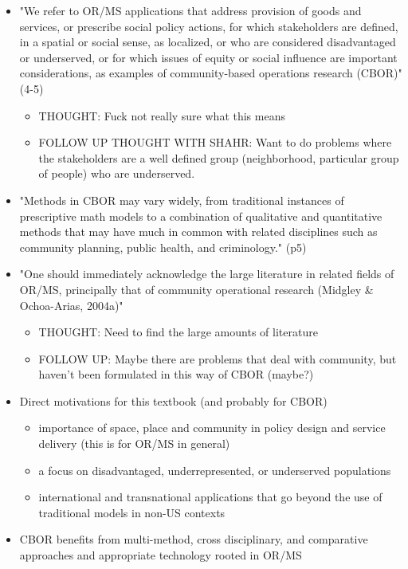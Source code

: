 \documentclass{article}
\begin{document}
\begin{itemize}
\begin{itemize}
    \end{itemize}
\item "We refer to OR/MS applications that address provision of goods and services, or prescribe social policy actions, for which stakeholders are defined, in a spatial or social sense, as localized, or who are considered disadvantaged or underserved, or for which issues of equity or social influence are important considerations, as examples of community-based operations research (CBOR)" (4-5)
	\begin{itemize}
	\item THOUGHT: Fuck not really sure what this means
    \item FOLLOW UP THOUGHT WITH SHAHR: Want to do problems where the stakeholders are a well defined group (neighborhood, particular group of people) who are underserved. 
	\end{itemize}
\item "Methods in CBOR may vary widely, from traditional instances of prescriptive math models to a combination of qualitative and quantitative methods that may have much in common with related disciplines such as community planning, public health, and criminology." (p5)
\item "One should immediately acknowledge the large literature in related fields of OR/MS, principally that of community operational research (Midgley \& Ochoa-Arias, 2004a)"
	\begin{itemize}
	\item THOUGHT: Need to find the large amounts of literature 
    \item FOLLOW UP: Maybe there are problems that deal with community, but haven't been formulated in this way of CBOR (maybe?)
	\end{itemize}
\item Direct motivations for this textbook (and probably for CBOR)
	\begin{itemize}
	\item importance of space, place and community in policy design and service delivery (this is for OR/MS in general)
    \item a focus on disadvantaged, underrepresented, or underserved populations
    \item international and transnational applications that go beyond the use of traditional models in non-US contexts
	\end{itemize}
\item CBOR benefits from multi-method, cross disciplinary, and comparative approaches and appropriate technology rooted in OR/MS

\end{itemize}
\end{document}

